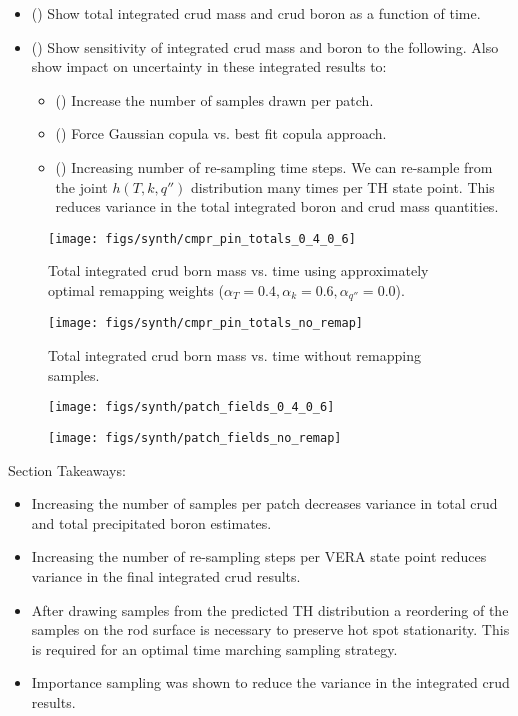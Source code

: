 \begin{itemize}
	\item (\checkmark) Show total integrated crud mass and crud boron as a function of time.
	\item (\checkmark) Show sensitivity of integrated crud mass and boron to the following.  Also show impact on uncertainty in these integrated results to:
	\begin{itemize}
		\item (\checkmark) Increase the number of samples drawn per patch.
		\item (\checkmark) Force Gaussian copula vs. best fit copula approach.
		\item (\checkmark) Increasing number of re-sampling time steps.
		We can re-sample from the joint $h(T, k, q'')$ distribution many times per TH state point.
		This reduces variance in the total integrated boron and crud mass quantities.
	\end{itemize}
\end{itemize}

\begin{figure}[H]
    \centering
    \texttt{[image: figs/synth/cmpr\_pin\_totals\_0\_4\_0\_6]}
    \caption[Total integrated crud born mass vs. time using approximately optimal remapping weights.]{Total integrated crud born mass vs. time using approximately optimal remapping weights ($\alpha_T=0.4, \alpha_{k}=0.6, \alpha_{q''}=0.0$).}
    \label{fig:cmprpintotals0406}
\end{figure}

\begin{figure}[H]
    \centering
    \texttt{[image: figs/synth/cmpr\_pin\_totals\_no\_remap]}
    \caption{Total integrated crud born mass vs. time without remapping samples.}
    \label{fig:cmprpintotalsnoremap}
\end{figure}

\begin{figure}[H]
    \centering
    \texttt{[image: figs/synth/patch\_fields\_0\_4\_0\_6]}
    \caption{}
    \label{fig:patchfields0406}
\end{figure}
\begin{figure}[H]
    \centering
    \texttt{[image: figs/synth/patch\_fields\_no\_remap]}
    \caption{}
    \label{fig:patchfieldsnoremap}
\end{figure}


Section Takeaways:
\begin{itemize}
	\item Increasing the number of samples per patch decreases variance in total crud and total precipitated boron estimates.
	\item Increasing the number of re-sampling steps per VERA state point reduces variance in the final integrated crud results.
    \item After drawing samples from the predicted TH distribution a reordering of the samples on the rod surface is necessary to preserve hot spot stationarity.  This is required for an optimal time marching sampling strategy.
    \item Importance sampling was shown to reduce the variance in the integrated crud results.
\end{itemize}

